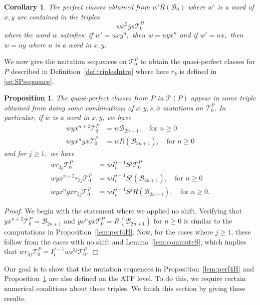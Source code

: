 \documentclass[11pt, reqno]{amsart}
\newtheorem{prop}[thm]{Proposition}
\newtheorem{cor}[thm]{Corollary}
\theoremstyle{remark}
\numberwithin{equation}{subsection}
\numberwithin{figure}{section}
\theoremstyle{customremark}
\newcommand{\Tt}{\mathcal{T}}
\newcommand{\ov}{\overline}
\newcommand{\T}{\mathcal{T}}
\begin{document}
\begin{cor} \label{cor:rTrip}
    The perfect classes obtained from $w'R(\mathcal{B}_0)$ where $w'$ is a word of $x,y$ are contained in the triples
    \[w\ov{x}^2\ov{y}s\Tt_0^H\] where the word $w$ satisfies: 
    if $w'=uxy^n,$ then $w=uy\ov{x}^n$ and if $w'=ux,$ then $w=uy$ where $u$ is a word in $x,y.$
\end{cor}



We now give the mutation sequences on $\Tt_0^P$ to obtain the quasi-perfect classes for $P$ described in Definition~\ref{def:triplesIntro} where here $r_k$ is defined in \eqref{eq:SPsequence}.


\begin{prop} \label{lem:perf4P} The quasi-perfect classes from $P$ in $\T(P)$ appear in some triple obtained from doing some combinations of $x,y,s,\ov{x}$ mutations on 
$\Tt_{0}^P.$   In particular, if $w$ is a word in $x,y$, we have
 \begin{align*}
        wy\ov{x}^{n+2}\Tt_{0}^P&=w\mathcal{B}_{2n+1}, \quad \text{for $n \geq 0$} \\
        wyx^ny\ov{x}\Tt_{0}^P&=wR(\mathcal{B}_{2n+1}), \quad \text{for $n \geq 0$} 
    \end{align*}
    and for $j \geq 1,$ we have 
       \begin{align*}
wr_{3j}\Tt_{0}^P&=wI_t^{j-1}S^j\Tt^P_{0} \\
        wy\ov{x}^{n+2}r_{3j}\Tt_{0}^P&=wI_t^{j-1}S^j(\mathcal{B}_{2n+1}), \quad \text{for $n \geq 0$} \\
        wyx^ny\ov{x}r_{3j}\Tt_{0}^P&=wI_t^{j-1}S^jR(\mathcal{B}_{2n+1}), \quad \text{for $n \geq 0$}.
    \end{align*}
\end{prop}
\begin{proof}
We begin with the statement where we applied no shift. Verifying that $y\ov{x}^{n+2}\T_0^P=\mathcal{B}_{2n+1}$ and $yx^ny\ov{x}\T_0^P=R(\mathcal{B}_{2n+1})$ for $n \geq 0$ is similar to the computations in Proposition~\ref{lem:perf4H}. Now, for the cases where $j \geq 1$, these follow from the cases with no shift and Lemma~\ref{lem:commuteS}, which implies that $wr_{3j}\Tt_0^P=I_t^{j-1}ws^{3j}\Tt_0^P$. 

\end{proof}

Our goal is to show that the mutation sequences in Proposition~\ref{lem:perf4H} and Proposition~\ref{lem:perf4P} are also defined on the ATF level. To do this, we require certain numerical conditions about these triples. We finish this section by giving these results. 
\end{document}
